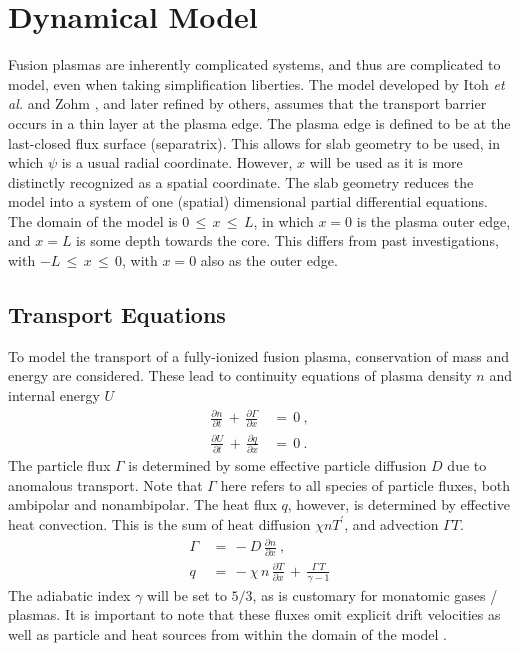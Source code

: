 \chapter{Dynamical Model}\label{chapter:dynamical_model}
Fusion plasmas are inherently complicated systems, and thus are complicated to model, even when taking simplification liberties.
The model developed by Itoh \emph{et al.} \cite{itoh_edge_1991} and Zohm \cite{zohm_dynamic_1994}, and later refined by others, assumes that the transport barrier occurs in a thin layer at the plasma edge.
The plasma edge is defined to be at the last-closed flux surface (separatrix).
This allows for slab geometry to be used, in which $\psi$ is a usual radial coordinate.
However, $x$ will be used as it is more distinctly recognized as a spatial coordinate.
The slab geometry reduces the model into a system of one (spatial) dimensional partial differential equations.
The domain of the model is $0 \,\leq\, x \,\leq\, L$, in which $x = 0$ is the plasma outer edge, and $x = L$ is some depth towards the core.
This differs from past investigations, with $-L \,\leq\, x \,\leq\, 0$, with $x = 0$ also as the outer edge.

\section{Transport Equations}\label{sec:transport_eqs}
To model the transport of a fully-ionized fusion plasma, conservation of mass and energy are considered.
These lead to continuity equations of plasma density $n$ and internal energy $U$
\begin{align} %
	\frac{\partial n}{\partial t} \,+\, \frac{\partial \Gamma}{\partial x} \,&=\, 0~,\label{eq:n_continuity} \\
	\frac{\partial U}{\partial t} \,+\, \frac{\partial q}{\partial x} \,&=\, 0\label{eq:U_continuity}~.
\end{align}
The particle flux $\Gamma$ is determined by some effective particle diffusion $D$ due to anomalous transport.
Note that $\Gamma$ here refers to all species of particle fluxes, both ambipolar and nonambipolar.
The heat flux $q$, however, is determined by effective heat convection.
This is the sum of heat diffusion $\chi n T^\prime$, and advection $\Gamma T$.
\begin{align} %
	\Gamma \,&=\, -D \, \frac{\partial n}{\partial x}~,
		\label{eq:particle_flux} \\
	q \,&=\, -\chi \, n \, \frac{\partial T}{\partial x} \,+\,
		\frac{\Gamma \, T}{\gamma - 1} \label{eq:heat_flux}
\end{align}
The adiabatic index $\gamma$ will be set to $5/3$, as is customary for monatomic gases / plasmas.
It is important to note that these fluxes omit explicit drift velocities as well as particle and heat sources from within the domain of the model \cite{zohm_dynamic_1994}.

